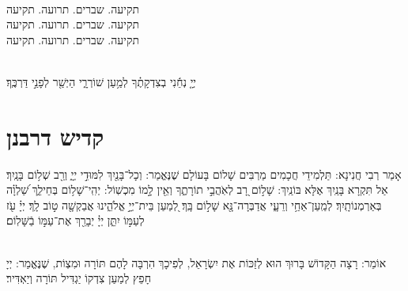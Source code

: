 \documentclass[twoside, openany, parskip=half, 11pt]{book}
\begin{document}
\mournerskaddish 

\\
תקיעה. שברים. תרועה. תקיעה\\
תקיעה. שברים. תרועה. תקיעה\\
תקיעה. שברים. תרועה. תקיעה


\\
 יְיָ֤ נְחֵ֬נִי בְצִדְקָתֶ֗ךָ לְמַ֥עַן שׁוֹרְרָ֑י הַיְשַׁ֖ר לְפָנַ֣י דַּרְכֶּֽךָ׃

\vfill

\quad{}\quad{}


 

\section[קדיש דרבנן]{ קדיש דרבנן }
\label{kaddish derabonan}


  אָמַר רְבִי חֲנִינָא: תַּלְמִידֵי חֲכָמִים מַרְבִּים שָׁלוֹם בָּעוֹלָם שֶׁנֶּאֱמַר: וְכָל־בָּנַ֖יִךְ לִמּוּדֵ֣י יְיָ֑ וְרַ֖ב שְׁל֥וֹם בָּנָֽיִךְ׃ אַל תִּקְרָא בָּנַֽיִךְ אֶלָּא בּוֹנַֽיִךְ: שָׁל֣וֹם רָ֭ב לְאֹֽהֲבֵ֣י תוֹרָתֶ֑ךָ וְאֵ֖ין לָ֣מוֹ מִכְשֽׁוֹל: יְהִֽי־שָׁל֥וֹם בְּחֵילֵ֑ךְ שַׁ֝לְוָ֗ה בְּאַרְמְנוֹתָֽיִךְ׃ לְמַֽעַן־אַחַ֥י וְרֵעָ֑י אֲדַבְּרָה־נָּ֖א שָׁל֣וֹם בָּֽךְ׃ לְ֭מַעַן בֵּית־יְיָ֣ אֱלֹהֵ֑ינוּ אֲבַקְשָׁ֖ה ט֣וֹב לָֽךְ׃ יְיָ֗ עֹ֖ז לְעַמּ֣וֹ יִתֵּ֑ן יְיָ֓  יְבָרֵ֖ךְ אֶת־עַמּ֣וֹ בַֿשָּׁלֽוֹם׃

\\
 אוֹמֵר: 
רָצָה הַקָּדוֹשׁ בָּרוּךְ הוּא לְזַכּוֹת אֶת יִשְׂרָאֵל, לְפִיכָךְ הִרְבָּה לָהֶם תּוֹרָה וּמִצְוֹת, 
שֶׁנֶּאֱמַר: יְיָ חָפֵץ לְמַעַן צִדְקוֹ יַגְדִּיל תּוֹרָה וְיַאְדִּיר׃
\end{document}
